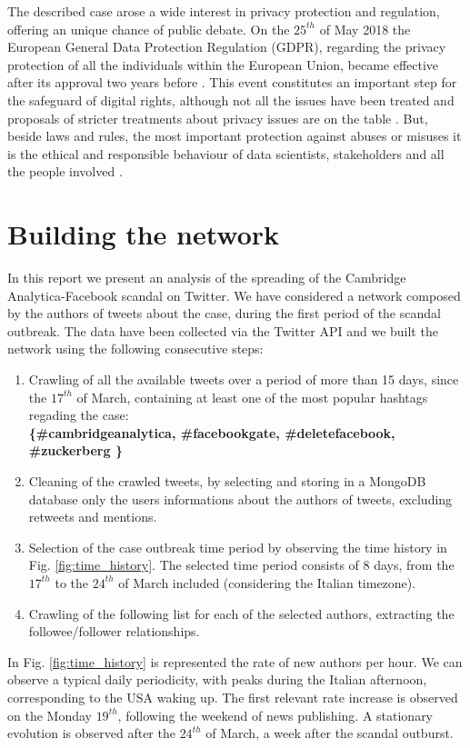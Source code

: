\documentclass[11pt, twoside]{report}
\begin{document}
The described case arose a wide interest in privacy protection and regulation, offering an unique chance of public debate.
On the $25^{th}$ of May 2018 the European General Data Protection Regulation (GDPR), regarding the privacy protection of
all the individuals within the European Union, became effective after its approval two years before \cite{gdpr}.
This event constitutes an important step for the safeguard of digital rights, although not all the issues have been treated and proposals
of stricter treatments about privacy issues are on the table \cite{stallman}.
But, beside laws and rules, the most important protection against abuses or misuses it is the ethical and responsible behaviour of data scientists, stakeholders and all the people involved \cite{fair}.


    \chapter{Building the network}
    In this report we present an analysis of the spreading of the Cambridge Analytica-Facebook scandal on Twitter.
    We have considered a network composed by the authors of tweets about the case, during the first period of the scandal outbreak. The data have been collected via the Twitter API and we built the network using the following consecutive steps:
    \begin{enumerate}
    \item Crawling of all the available tweets over a period of more than 15 days, since the $17^{th}$ of March, containing at least one of the most popular hashtags regading the case:\\
    \textbf{  \{\#cambridgeanalytica, \#facebookgate, \#deletefacebook, \#zuckerberg \} }

    \item Cleaning of the crawled tweets, by selecting and storing in a MongoDB database only the users informations about the authors of tweets, excluding retweets and mentions.
    \item Selection of the case outbreak time period by observing the time history in Fig. \ref{fig:time_history}. The selected time period consists of 8 days, from the $17^{th}$ to the $24^{th}$ of March included (considering the Italian timezone).

    \item Crawling of the following list for each of the selected authors, extracting the followee/follower relationships.
    \end{enumerate}
    In Fig. \ref{fig:time_history} is represented the rate of new authors per hour. %
    We can observe a typical daily periodicity, with peaks during the Italian afternoon, corresponding to the USA waking up.
    The first relevant rate increase is observed on the Monday $19^{th}$, following the weekend of news publishing. A stationary evolution is observed after the $24^{th}$ of March, a week after the scandal outburst.
\end{document}
